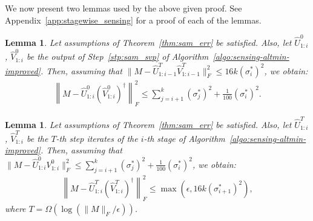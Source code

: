 \documentclass[11pt]{article}
\theoremstyle{plain}
\newtheorem{lemma}[theorem]{Lemma}
\theoremstyle{definition}
\newcommand{\so}{\sigma^*}
\newcommand{\Vw}{\widehat{V}}
\newcommand{\Uw}{\widehat{U}}
\begin{document}
We now present two lemmas used by the above given proof. See Appendix~\ref{app:stagewise_sensing} for a proof of each of the lemmas. 
\begin{lemma}\label{lemma:sam_svp_err}
Let assumptions of Theorem~\ref{thm:sam_err} be satisfied. Also, let $\Uw^0_{1:i}$, $\Vw^0_{1:i}$ be the output of Step~\ref{stp:sam_svp} of Algorithm~\ref{algo:sensing-altmin-improved}. Then, assuming that $\|M-\Uw^T_{1:i-1}\Vw^T_{1:i-1}\|_F^2\leq 16k(\so_{i})^2$, we obtain:
\begin{align*}
  \left\|M - \widehat{U}^0_{1:i}(\widehat{V}_{1:i}^0)^{\dag}\right\|_F^2 \leq \sum_{j=i+1}^k (\so_j)^2 + \frac{1}{100} (\so_{i})^2. 
\end{align*}
\end{lemma}
\begin{lemma}\label{lemma:sam_altmin}
Let assumptions of Theorem~\ref{thm:sam_err} be satisfied. Also, let $\Uw^T_{1:i}$, $\Vw^T_{1:i}$ be the $T$-th step iterates of the $i$-th stage of Algorithm~\ref{algo:sensing-altmin-improved}. Then, assuming that $\|M-\Uw^0_{1:i}V^0_{1:i}\|_F^2\leq \sum_{j=i+1}^k (\so_j)^2 + \frac{1}{100} (\so_{i})^2$, we obtain:
\begin{align*}
  \left\|M - \widehat{U}^T_{1:i}(\widehat{V}_{1:i}^T)^{\dag}\right\|_F^2 \leq \max(\epsilon, 16k(\so_{i+1})^2),
\end{align*}
where $T=\Omega(\log(\|M\|_F/\epsilon))$. 
\end{lemma}
\end{document}
